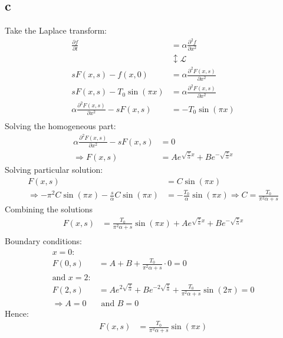 \documentclass[11pt]{article}
\begin{document}
\subsection{c}
\label{sec:org5e09181}
Take the Laplace transform:
\begin{align*}
\frac{\partial f}{\partial t}&=\alpha \frac{\partial^2f}{\partial x^2} \\
&\updownarrow \mathcal{L}\\
sF(x,s)-f(x,0) &=\alpha \frac{\partial ^2F(x,s)}{\partial x^2} \\
sF(x,s)-T_0\sin(\pi x) &=\alpha \frac{\partial ^2F(x,s)}{\partial x^2} \\
\alpha \frac{\partial ^2F(x,s)}{\partial x^2}-sF(x,s) &= -T_0\sin(\pi x)\\
\end{align*}
Solving the homogeneous part:
\begin{align*}
\alpha \frac{\partial^2F(x,s)}{\partial x^2}-sF(x,s) &= 0 \\
\Rightarrow F(x,s)&=Ae^{\sqrt{\frac{s}{\alpha}}x}+Be^{-\sqrt{\frac{s}{\alpha}}x}
\end{align*}
Solving particular solution:
\begin{align*}
F(x,s) &= C\sin(\pi x) \\
\Rightarrow -\pi^2C\sin(\pi x)-\frac{s}{\alpha}C\sin(\pi x) &= -\frac{T_0}{\alpha}\sin(\pi x)
\Rightarrow C=\frac{T_0}{\pi^2\alpha+s}
\end{align*}
Combining the solutions
\begin{align*}
F(x,s) &= \frac{T_0}{\pi^2\alpha+s}\sin(\pi x) + Ae^{\sqrt{\frac{s}{\alpha}}x}+Be^{-\sqrt{\frac{s}{\alpha}}x} \\
\end{align*}
Boundary conditions:
\begin{align*}
x=0:& \\
F(0,s) &= A+B+\frac{T_0}{\pi^2\alpha+s}\cdot 0 = 0 \\
\textrm{and } x=2:& \\
F(2,s) &= Ae^{2\sqrt{\frac{s}{\alpha}}}+Be^{-2\sqrt{\frac{s}{\alpha}}}+\frac{T_0}{\pi^2\alpha+s}\sin(2\pi) = 0 \\
\Rightarrow A=0 &\textrm{ and } B=0
\end{align*}
Hence:
\begin{align*}
F(x,s) &= \frac{T_0}{\pi^2\alpha+s}\sin(\pi x)\\
\end{align*}
\end{document}
